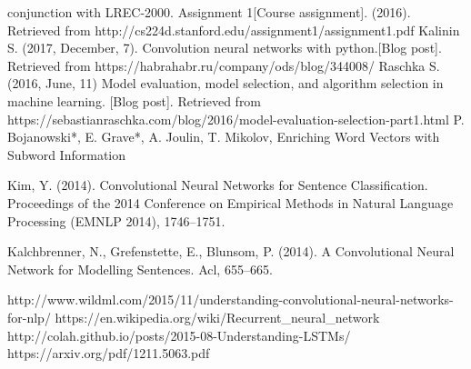 \begin{thebibliography}
	 conjunction with LREC-2000.
	 {}
	  Assignment 1[Course assignment]. (2016). Retrieved from http://cs224d.stanford.edu/assignment1/assignment1.pdf 
	 {}
		Kalinin S. (2017, December, 7). Convolution neural networks with python.[Blog post]. Retrieved from https://habrahabr.ru/company/ods/blog/344008/
		Raschka S. (2016, June, 11) Model evaluation, model selection, and algorithm selection in machine learning. [Blog post]. Retrieved from
		https://sebastianraschka.com/blog/2016/model-evaluation-selection-part1.html
	 P. Bojanowski*, E. Grave*, A. Joulin, T. Mikolov, Enriching Word Vectors with Subword Information

	Kim, Y. (2014). Convolutional Neural Networks for Sentence Classification. Proceedings of the 2014 Conference on Empirical Methods in Natural Language Processing (EMNLP 2014), 1746–1751.
	
	Kalchbrenner, N., Grefenstette, E.,  Blunsom, P. (2014). A Convolutional Neural Network for Modelling Sentences. Acl, 655–665.
	
	http://www.wildml.com/2015/11/understanding-convolutional-neural-networks-for-nlp/
	https://en.wikipedia.org/wiki/Recurrent\_neural\_network 
	http://colah.github.io/posts/2015-08-Understanding-LSTMs/
	https://arxiv.org/pdf/1211.5063.pdf
	
\end{thebibliography}

